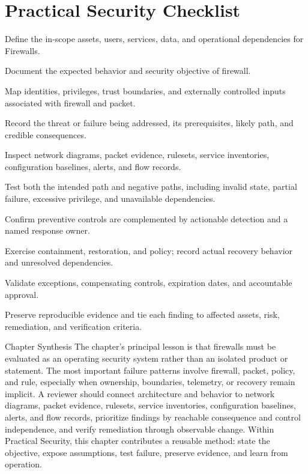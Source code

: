 \documentclass[11pt,letterpaper]{article}
\begin{document}
\section*{Practical Security Checklist}
\begin{CornellChecklist}
\item Define the in-scope assets, users, services, data, and operational dependencies for Firewalls.
\item Document the expected behavior and security objective of firewall.
\item Map identities, privileges, trust boundaries, and externally controlled inputs associated with firewall and packet.
\item Record the threat or failure being addressed, its prerequisites, likely path, and credible consequences.
\item Inspect network diagrams, packet evidence, rulesets, service inventories, configuration baselines, alerts, and flow records.
\item Test both the intended path and negative paths, including invalid state, partial failure, excessive privilege, and unavailable dependencies.
\item Confirm preventive controls are complemented by actionable detection and a named response owner.
\item Exercise containment, restoration, and policy; record actual recovery behavior and unresolved dependencies.
\item Validate exceptions, compensating controls, expiration dates, and accountable approval.
\item Preserve reproducible evidence and tie each finding to affected assets, risk, remediation, and verification criteria.
\end{CornellChecklist}
\begin{CornellSummaryBox}{Chapter Synthesis}
The chapter's principal lesson is that firewalls must be evaluated as an operating security system rather than an isolated product or statement. The most important failure patterns involve firewall, packet, policy, and rule, especially when ownership, boundaries, telemetry, or recovery remain implicit. A reviewer should connect architecture and behavior to network diagrams, packet evidence, rulesets, service inventories, configuration baselines, alerts, and flow records, prioritize findings by reachable consequence and control independence, and verify remediation through observable change. Within Practical Security, this chapter contributes a reusable method: state the objective, expose assumptions, test failure, preserve evidence, and learn from operation.
\end{CornellSummaryBox}
\end{document}
